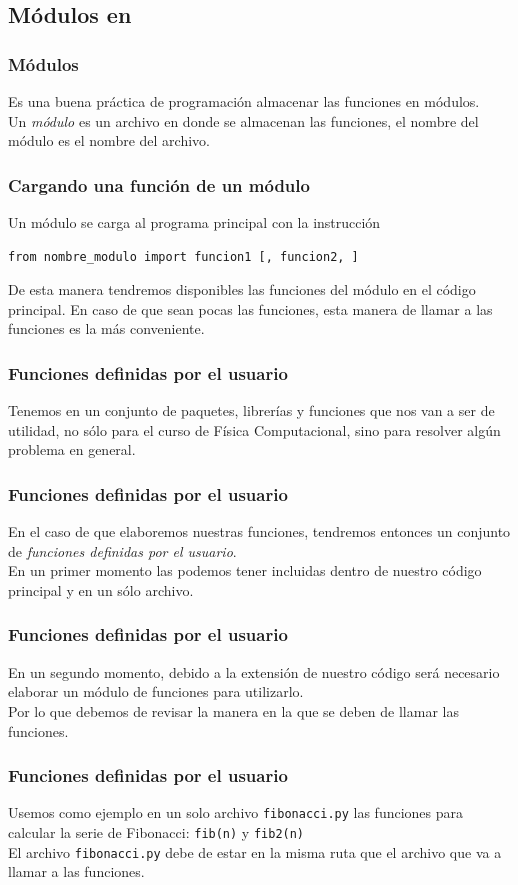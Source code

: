 \subsection{Módulos en \python}
\begin{frame}[fragile]
\frametitle{Módulos}
Es una buena práctica de programación almacenar las funciones en módulos.
\\
\bigskip
\pause
Un \emph{módulo} es un archivo en donde se almacenan las funciones, el nombre del módulo es el nombre del archivo.
\end{frame}
\begin{frame}[fragile]
\frametitle{Cargando una función de un módulo}
Un módulo se carga al programa principal con la instrucción
{\fontsize{12}{12}\selectfont
\begin{lstlisting}
from nombre_modulo import funcion1 [, funcion2, ]
\end{lstlisting}}
\pause
De esta manera tendremos disponibles las funciones del módulo en el código principal. En caso de que sean pocas las funciones, esta manera de llamar a las funciones es la más conveniente.
\end{frame}
\begin{frame}[fragile]
\frametitle{Funciones definidas por el usuario}
Tenemos en \python{} un conjunto de paquetes, librerías y funciones que nos van a ser de utilidad, no sólo para el curso de Física Computacional, sino para resolver algún problema en general.
\end{frame} 
\begin{frame}[fragile]
\frametitle{Funciones definidas por el usuario}
En el caso de que elaboremos nuestras funciones, tendremos entonces un conjunto de \emph{funciones definidas por el usuario}.
\\
\bigskip
En un primer momento las podemos tener incluidas dentro de nuestro código principal y en un sólo archivo.
\end{frame}
\begin{frame}[fragile]
\frametitle{Funciones definidas por el usuario}
En un segundo momento, debido a la extensión de nuestro código será necesario elaborar un módulo de funciones para utilizarlo.
\\
\bigskip
Por lo que debemos de revisar la manera en la que se deben de llamar las funciones. 
\end{frame}
\begin{frame}[fragile]
\frametitle{Funciones definidas por el usuario}
Usemos como ejemplo en un solo archivo \texttt{fibonacci.py} las funciones para calcular la serie de Fibonacci: \texttt{fib(n)} y \texttt{fib2(n)}
\\
\bigskip
El archivo \texttt{fibonacci.py} debe de estar en la misma ruta que el archivo que va a llamar a las funciones.
\end{frame}
